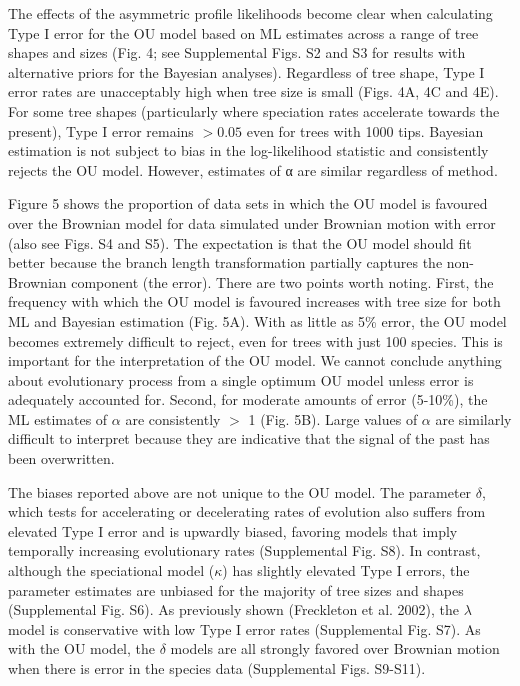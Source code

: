 \documentclass[a4paper,12pt]{article}
\begin{document}
The effects of the asymmetric profile likelihoods become clear when calculating Type I error for the OU model based on ML estimates across a range of tree shapes and sizes (Fig. 4; see Supplemental Figs. S2 and S3 for results with alternative priors for the Bayesian analyses). Regardless of tree shape, Type I error rates are unacceptably high when tree size is small (Figs. 4A, 4C and 4E). For some tree shapes (particularly where speciation rates accelerate towards the present), Type I error remains $>0.05$ even for trees with 1000 tips. Bayesian estimation is not subject to bias in the log-likelihood statistic and consistently rejects the OU model. However, estimates of α are similar regardless of method.

Figure 5 shows the proportion of data sets in which the OU model is favoured over the Brownian model for data simulated under Brownian motion with error (also see Figs. S4 and S5). The expectation is that the OU model should fit better because the branch length transformation partially captures the non-Brownian component (the error). There are two points worth noting. First, the frequency with which the OU model is favoured increases with tree size for both ML and Bayesian estimation (Fig. 5A). With as little as 5\% error, the OU model becomes extremely difficult to reject, even for trees with just 100 species. This is important for the interpretation of the OU model. We cannot conclude anything about evolutionary process from a single optimum OU model unless error is adequately accounted for. Second, for moderate amounts of error (5-10\%), the ML estimates of $\alpha$ are consistently $>$ 1 (Fig. 5B). Large values of $\alpha$ are similarly difficult to interpret because they are indicative that the signal of the past has been overwritten. 

The biases reported above are not unique to the OU model. The parameter $\delta$, which tests for accelerating or decelerating rates of evolution \citep{Pagel:1997aa,Pagel:1999aa} also suffers from elevated Type I error and is upwardly biased, favoring models that imply temporally increasing evolutionary rates (Supplemental Fig. S8). In contrast, although the speciational model ($\kappa$) has slightly elevated Type I errors, the parameter estimates are unbiased for the majority of tree sizes and shapes (Supplemental Fig. S6). As previously shown (Freckleton et al. 2002), the $\lambda$ model is conservative with low Type I error rates (Supplemental Fig. S7). As with the OU model, the $\delta$ models are all strongly favored over Brownian motion when there is error in the species data (Supplemental Figs. S9-S11). 
\end{document}
